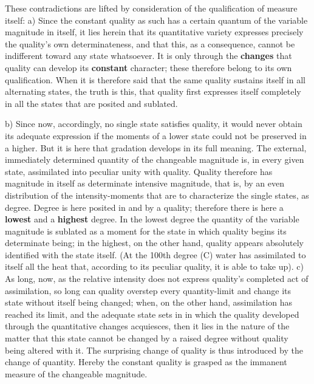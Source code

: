 \documentclass[12pt,a4paper,openany]{book}
\newcommand{\opage}[1]{\marginnote{\footnotesize\textit{[#1]}}}
\begin{document}
These contradictions are lifted by consideration of the qualification of measure itself: a) Since the constant quality as such has a certain quantum of the variable magnitude in itself, it lies herein that its quantitative variety expresses precisely the quality's own determinateness, and that this, as a consequence, cannot be indifferent toward any state whatsoever. It is only through the \textbf{changes} that quality can develop its \textbf{constant} character; these therefore belong to its own qualification. When it is therefore said that the same quality sustains itself in all alternating states, the truth is this, that quality first expresses itself completely in all the states that are posited and sublated.

b) Since now, accordingly, no single state satisfies quality, it would never obtain its adequate expression if the moments of a lower state could not be preserved in a higher. But it is here that gradation develops in its full meaning. The external, immediately determined quantity of the changeable magnitude is, in every given state, assimilated into peculiar unity with quality. Quality therefore has magnitude in itself as determinate intensive magnitude, that is, by an even distribution of the intensity-moments that are to characterize the single states, as degree. %
\setcounter{footnote}{0}%
\opage{64}Degree is here posited in and by a quality; therefore there is here a \textbf{lowest} and a \textbf{highest} degree. In the lowest degree the quantity of the variable magnitude is sublated as a moment for the state in which quality begins its determinate being; in the highest, on the other hand, quality appears absolutely identified with the state itself. (At the 100th degree (C) water has assimilated to itself all the heat that, according to its peculiar quality, it is able to take up). c) As long, now, as the relative intensity does not express quality's completed act of assimilation, so long can quality overstep every quantity-limit and change its state without itself being changed; when, on the other hand, assimilation has reached its limit, and the adequate state sets in in which the quality developed through the quantitative changes acquiesces, then it lies in the nature of the matter that this state cannot be changed by a raised degree without quality being altered with it. The surprising change of quality is thus introduced by the change of quantity. Hereby the constant quality is grasped as the immanent measure of the changeable magnitude.
\end{document}

